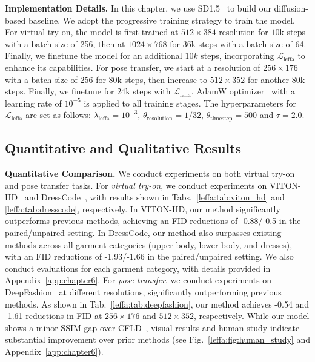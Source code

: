 \noindent \textbf{Implementation Details.}
In this chapter, we use SD1.5~\citep{rombach2022high} to build our diffusion-based baseline.
We adopt the progressive training strategy to train the model.
For virtual try-on, the model is first trained at $512 \times 384$ resolution for $10\text{k}$ steps with a batch size of 256, then at $1024 \times 768$ for $36\text{k}$ steps with a batch size of 64.
Finally, we finetune the model for an additional $10k$ steps, incorporating $\mathcal{L}_{\text{leffa}}$ to enhance its capabilities.
For pose transfer, we start at a resolution of $256 \times 176$ with a batch size of 256 for $80\text{k}$ steps, then increase to $512 \times 352$ 
for another $80\text{k}$ steps.
Finally, we finetune for $24\text{k}$ steps with $\mathcal{L}_{\text{leffa}}$.
AdamW optimizer~\citep{loshchilov2017decoupled} with a learning rate of $10^{-5}$ is applied to all training stages.
The hyperparameters for $\mathcal{L}_{\text{leffa}}$ are set as follows: $\lambda_{\text{leffa}} = 10^{-3}$, $\theta_{\text{resolution}} = 1/32$, $\theta_{\text{timestep}} = 500$ and $\tau = 2.0$.


\subsection{Quantitative and Qualitative Results}
\label{leffa:sec:main_results}

\noindent \textbf{Quantitative Comparison.}
We conduct experiments on both virtual try-on and pose transfer tasks.
For \textit{virtual try-on}, we conduct experiments on VITON-HD~\citep{choi2021viton} and DressCode~\citep{morelli2022dress}, with results shown in Tabs.~\ref{leffa:tab:viton_hd} and \ref{leffa:tab:dresscode}, respectively.
In VITON-HD, our method significantly outperforms previous methods, achieving an FID reductions of -0.88/-0.5 in the paired/unpaired setting.
In DressCode, our method also surpasses existing methods across all garment categories (upper body, lower body, and dresses), with an FID reductions of -1.93/-1.66 in the paired/unpaired setting.
We also conduct evaluations for each garment category, with details provided in Appendix~\ref{app:chapter6}.
For \textit{pose transfer}, we conduct experiments on DeepFashion~\citep{liu2016deepfashion} at different resolutions, significantly outperforming previous methods.
As shown in Tab.~\ref{leffa:tab:deepfashion}, our method achieves -0.54 and -1.61 reductions in FID at $256 \times 176$ and $512 \times 352$, respectively.
While our model shows a minor SSIM gap over CFLD~\citep{lu2024coarse}, visual results and human study indicate substantial improvement over prior methods (see Fig.~\ref{leffa:fig:human_study} and Appendix~\ref{app:chapter6}).


